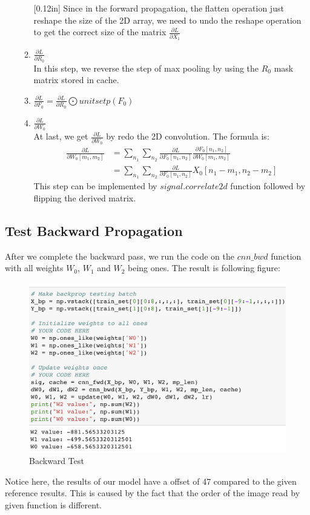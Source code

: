 \documentclass[12pt]{article}
\begin{document}
\begin{itemize}
\begin{enumerate}
				[0.12in]
				Since in the forward propagation, the flatten operation just reshape the size of the 2D array, we need to undo the reshape operation to get the correct size of the matrix $\frac{\partial L}{\partial X_1}$
				\item $\frac{\partial L}{\partial R_0}$ \\
				[0.12in]
				In this step, we reverse the step of max pooling by using the $R_0$ mask matrix stored in cache.
				\item $\frac{\partial L}{\partial F_0} = \frac{\partial L}{\partial R_0} \bigodot unitsetp(F_0)$
				\item $\frac{\partial L}{\partial W_0}$ \\
				[0.12in]
				At last, we get $\frac{\partial L}{\partial W_0}$ by redo the 2D convolution. The formula is:
				\begin{align}
				\frac{\partial L}{\partial W_0[m_1, m_2]} & = \sum_{n_1}\sum_{n_2} \frac{\partial L}{\partial F_0[n_1, n_2]} \frac{\partial F_0[n_1, n_2]}{\partial W_0[m_1, m_2]} \\ & = \sum_{n_1}\sum_{n_2} \frac{\partial L}{\partial F_0[n_1, n_2]} X_0[n_1-m_1, n_2-m_2]
				\end{align}
				This step can be implemented by $signal.correlate2d$ function followed by flipping the derived matrix.
			\end{enumerate}
		\end{itemize}

	\subsection*{Test Backward Propagation}
		After we complete the backward pass, we run the code on the $cnn\_bwd$ function with all weights $W_0$, $W_1$ and $W_2$ being ones. The result is following figure:
		\begin{figure}[ht]
			\begin{center}
				\includegraphics[width = 13cm]{back_test}
			\end{center}
			\caption{Backward Test}
		\end{figure}
		\newline
		Notice here, the results of our model have a offset of 47 compared to the given reference results. This is caused by the fact that the order of the image read by given function is different.
\end{document}
